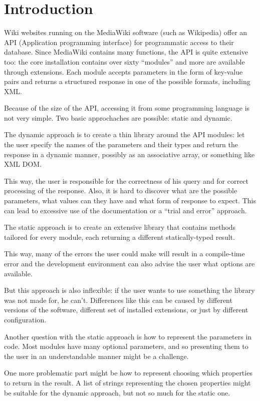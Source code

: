 \chapter*{Introduction}

Wiki websites running on the MediaWiki software (such as Wikipedia) offer an API (Application programming interface)
for programmatic access to their database.
Since MediaWiki contains many functions, the API is quite extensive too:  the core installation contains over sixty ``modules''
and more are available through extensions. Each module accepts parameters in the form of key-value pairs
and returns a structured response in one of the possible formats, including XML.

Because of the size of the API, accessing it from some programming language is not very simple.
Two basic approchaches are possible: static and dynamic.

The dynamic approach is to create a thin library around the API modules:
let the user specify the names of the parameters and their types and return the response
in a dynamic manner, possibly as an associative array, or something like XML DOM.

This way, the user is responsible for the correctness of his query and for correct processing
of the response.
Also, it is hard to discover what are the possible parameters, what values can they have
and what form of response to expect.
This can lead to excessive use of the documentation or a ``trial and error'' approach.

The static approach is to create an extensive library that contains methods tailored for every module,
each returning a different statically-typed result.

This way, many of the errors the user could make will result in a compile-time error
and the development environment can also advise the user what options are available.

But this approach is also inflexible: if the user wants to use something the library
was not made for, he can't.
Differences like this can be caused by different versions of the software,
different set of installed extensions, or just by different configuration.

Another question with the static approach is how to represent the parameters in code.
Most modules have many optional parameters, and so presenting them to the user
in an understandable manner might be a challenge.

One more problematic part might be how to represent choosing which properties to return in the result.
A list of strings representing the chosen properties might be suitable for the dynamic approach, but not so much for the static one.


